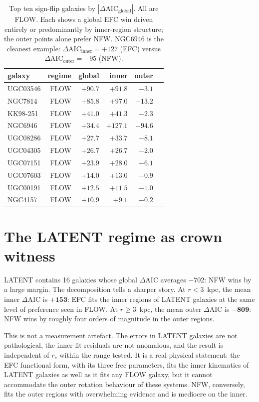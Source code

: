 \documentclass[11pt,a4paper]{article}
\begin{document}
\begin{table}[h]
\centering
\small
\begin{tabular}{lrrrrr}
\toprule
galaxy & regime & global & inner & outer \\
\midrule
UGC03546 & FLOW & $+90.7$  & $+91.8$  & $-3.1$  \\
NGC7814  & FLOW & $+85.8$  & $+97.0$  & $-13.2$ \\
KK98-251 & FLOW & $+41.0$  & $+41.3$  & $-2.3$  \\
NGC6946  & FLOW & $+34.4$  & $+127.1$ & $-94.6$ \\
UGC08286 & FLOW & $+27.7$  & $+33.7$  & $-8.1$  \\
UGC04305 & FLOW & $+26.7$  & $+26.7$  & $-2.0$  \\
UGC07151 & FLOW & $+23.9$  & $+28.0$  & $-6.1$  \\
UGC07603 & FLOW & $+14.0$  & $+13.0$  & $-0.9$  \\
UGC00191 & FLOW & $+12.5$  & $+11.5$  & $-1.0$  \\
NGC4157  & FLOW & $+10.9$  & $+9.1$   & $-0.2$  \\
\bottomrule
\end{tabular}
\caption{Top ten sign-flip galaxies by $|\Delta\text{AIC}_{\text{global}}|$.
All are FLOW.  Each shows a global EFC win driven entirely or
predominantly by inner-region structure; the outer points alone prefer
NFW.  NGC6946 is the cleanest example: $\Delta\text{AIC}_{\text{inner}}=+127$
(EFC) versus $\Delta\text{AIC}_{\text{outer}}=-95$ (NFW).}
\label{tab:topflips}
\end{table}

\section{The LATENT regime as crown witness}
\label{sec:latent}

LATENT contains 16 galaxies whose global $\Delta\text{AIC}$ averages
$-702$: NFW wins by a large margin.  The decomposition tells a sharper
story.  At $r<3$~kpc, the mean inner $\Delta\text{AIC}$ is $\mathbf{+153}$:
EFC fits the inner regions of LATENT galaxies at the same level of
preference seen in FLOW.  At $r\ge3$~kpc, the mean outer $\Delta\text{AIC}$
is $\mathbf{-809}$: NFW wins by roughly four orders of magnitude in the
outer regions.

This is not a measurement artefact.  The errors in LATENT galaxies are
not pathological, the inner-fit residuals are not anomalous, and the
result is independent of $r_c$ within the range tested.  It is a real
physical statement: the EFC functional form, with its three free
parameters, fits the inner kinematics of LATENT galaxies as well as it
fits any FLOW galaxy, but it cannot accommodate the outer rotation
behaviour of these systems.  NFW, conversely, fits the outer regions
with overwhelming evidence and is mediocre on the inner.
\end{document}
